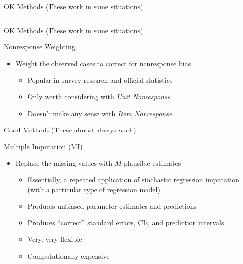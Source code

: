 \documentclass{beamer}\usepackage[]{graphicx}\usepackage[]{color}
\newenvironment{knitrout}{}{} %
\begin{document}
\begin{frame}{OK Methods (These work in some situations)}
\begin{columns}
\begin{column}{0.5\textwidth}
\begin{knitrout}
{}



\end{knitrout}

\end{column}
\end{columns}

\end{frame}

\watermarkon %

\begin{frame}{OK Methods (These work in some situations)}
  
  Nonresponse Weighting
  \vc
  \begin{itemize}
  \item Weight the observed cases to correct for nonresponse bias
    \vc
    \begin{itemize}
    \item Popular in survey research and official statistics
      \vc
    \item Only worth considering with \emph{Unit Nonresponse}
      \vc
    \item Doesn't make any sense with \emph{Item Nonresponse}
    \end{itemize}
  \end{itemize}
  
\end{frame}


\begin{frame}{Good Methods (These almost always work)}
  
  Multiple Imputation (MI)
  \vc
  \begin{itemize}
  \item Replace the missing values with $M$ plausible estimates
    \vc
    \begin{itemize}
    \item Essentially, a repeated application of stochastic regression 
      imputation (with a particular type of regression model)
      \vc
    \item Produces unbiased parameter estimates and predictions
      \vc
    \item Produces ``correct'' standard errors, CIs, and prediction intervals
      \vc
    \item Very, very flexible
      \vc
    \item Computationally expensive
    \end{itemize}
  \end{itemize}
  
\end{frame}
\end{document}
